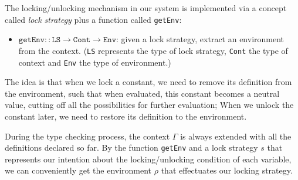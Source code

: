 \documentclass{article}
\theoremstyle{remark}
\begin{document}
The locking/unlocking mechanism in our system is implemented via a concept called \emph{lock strategy} plus a function called \texttt{getEnv}: 
\begin{itemize}
  \item $\texttt{getEnv} :: \texttt{LS} \to \texttt{Cont} \to \texttt{Env}$: given a lock strategy, extract an environment from the context. (\texttt{LS} represents the type of lock strategy, \texttt{Cont} the type of context and \texttt{Env} the type of environment.) 
\end{itemize}

The idea is that when we lock a constant, we need to remove its definition from the environment, such that when evaluated, this constant becomes a neutral value, cutting off all the possibilities for further evaluation; When we unlock the constant later, we need to restore its definition to the environment.

During the type checking process, the context $\Gamma$ is always extended with all the definitions declared so far. By the function \texttt{getEnv} and a lock strategy $s$ that represents our intention about the locking/unlocking condition of each variable, we can conveniently get the environment $\rho$ that effectuates our locking strategy.
\end{document}
